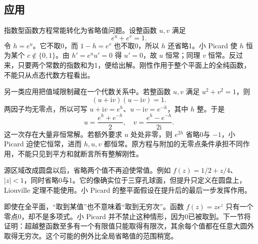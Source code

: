 \subsection{应用}
\label{b3:subsec:140403}

指数型函数方程常能转化为省略值问题。设整函数 \(u,v\) 满足
\[
 e^u+e^v=1.
\]
令 \(h=e^u\)。它不取0，而 \(1-h=e^v\) 也不取0，所以 \(h\) 还省略1。小 Picard 使 \(h\) 恒为某个 \(c\notin\{0,1\}\)。由 \(h'=e^u u'=0\) 得 \(u'=0\)，故 \(u\) 恒常；同理 \(v\) 恒常。反过来，只要两个常数的指数和为1，便给出解。刚性作用于整个平面上的全纯函数，不能只从点态代数方程看出。

\ProseParagraphBreak
另一类应用把值域限制藏在一个代数关系中。若整函数 \(u,v\) 满足 \(u^2+v^2=1\)，则
\[
 (u+\mathrm i v)(u-\mathrm i v)=1.
\]
两因子均无零点，所以可写 \(u+\mathrm i v=e^h\)、\(u-\mathrm i v=e^{-h}\)，其中 \(h\) 整。于是
\[
 u=\frac{e^h+e^{-h}}2,\quad
 v=\frac{e^h-e^{-h}}{2\mathrm i}.
\]
这一次存在大量非恒常解。若额外要求 \(u\) 处处非零，则 \(e^{2h}\) 省略0与 \(-1\)，小 Picard 迫使它恒常，进而 \(h,u,v\) 都恒常。原方程与附加的无零点条件承担不同作用，不能只见到平方和就断言所有整解刚性。

\ProseParagraphBreak
源区域改成圆盘以后，省略两个值不再迫使常值。例如 \(f(z)=1/2+z/4\)、\(|z|<1\)，同时省略0与1。它的像确实位于三穿孔球面，但提升只定义在圆盘上，Liouville 定理不能使用。小 Picard 的整平面假设在提升后的最后一步发挥作用。

\ProseParagraphBreak
即使在全平面，“取到某值”也不意味着“取到无穷次”。函数 \(f(z)=ze^z\) 只有一个零点0，却不是多项式。小 Picard 并不禁止这种情形，因为0已被取到。下一节将证明：超越整函数至多有一个有限值只能取得有限次，其余每个值都在任意大圆外取得无穷次。这个可能的例外比全局省略值的范围稍宽。
